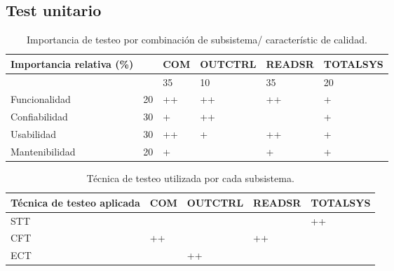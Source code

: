 \documentclass[
11pt, %
]{charter}
\begin{document}
\subsection{Test unitario}

\begin{table}[ht]
    \centering
    \begin{tabular}{|l|l|l|l|l|l|}\hline \hline
    \rowcolor[HTML]{d6c6c3}
 Importancia relativa (\%)& &  COM & OUTCTRL & READSR & TOTALSYS\\
        \hline
       
           &  &35 & 10 &35 & 20                          \\
        Funcionalidad    & 20 & ++ & ++ & ++ & +		\\
        Confiabilidad    & 30 &+ &++ & &+                        \\
        Usabilidad       & 30 &++ &+ &++ &+                        \\
        Mantenibilidad   & 20 &+ & &+ &+                        \\
        \hline
    \end{tabular}
    \caption{Importancia de testeo por combinación de subsistema/ característic de calidad.}
\end{table}


\begin{table}[ht]
    \centering
    \begin{tabular}{|l|l|l|l|l|}\hline \hline
    \rowcolor[HTML]{d6c6c3}
 Técnica de testeo aplicada & COM & OUTCTRL & READSR & TOTALSYS\\
        \hline
       STT & & & & ++ \\
      CFT & ++ & & ++& \\
      ECT & & ++ & &  \\
        \hline
    \end{tabular}
    \caption{Técnica de testeo utilizada por cada subsistema.}
\end{table}
\end{document}
